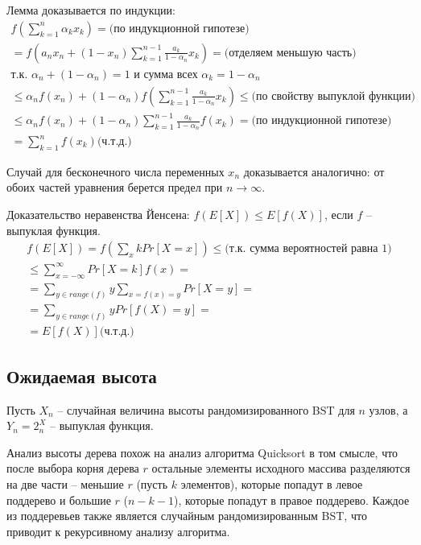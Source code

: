 \documentclass[11pt]{article}
\begin{document}
Лемма доказывается по индукции:
\begin{align*}
  f(\sum_{k=1}^{n} \alpha_k x_k) = \text{(по индукционной гипотезе)} \\ 
  = f(a_n x_n + (1-x_n) \sum_{k=1}^{n-1} \frac{a_k}{1-\alpha_n} x_k) = \text{(отделяем меньшую часть)} \\
  \text{т.к. } \alpha_n + (1-\alpha_n) = 1 \text{ и сумма всех } \alpha_k = 1 - \alpha_n \\
  \leqslant \alpha_n f(x_n) + (1-\alpha_n)f(\sum_{k=1}^{n-1} \frac{a_k}{1-\alpha_n} x_k) \leqslant \text{(по свойству выпуклой функции)} \\
  \leqslant \alpha_n f(x_n) + (1-\alpha_n)\sum_{k=1}^{n-1} \frac{a_k}{1-\alpha_n} f(x_k) = \text{(по индукционной гипотезе)} \\
  = \sum_{k=1}^{n} f(x_k) \text{(ч.т.д.)}
\end{align*}

Случай для бесконечного числа переменных $x_n$ доказывается аналогично: от обоих частей уравнения берется предел при $n \to \infty$.

Доказательство неравенства Йенсена: $f(E[X]) \leqslant E[f(X)]$, если $f$ -- выпуклая функция.
\begin{align*}
  f(E[X]) = f(\sum_{x} k Pr[X = x]) \leqslant \text{(т.к. сумма вероятностей равна 1)} \\
  \leqslant \sum_{x= - \infty}^{\infty} Pr[X = k] f(x) = \\ 
  = \sum_{y \in range(f)} y \sum_{x = f(x) = y} Pr[X = y] = \\
  = \sum_{y \in range(f)} y Pr[f(X) = y] = \\
  = E[f(X)] \text{(ч.т.д.)}
\end{align*}

\subsection{Ожидаемая высота}

Пусть $X_n$ -- случайная величина высоты рандомизированного BST для $n$ узлов, а $Y_n = 2^X_n$ -- выпуклая функция.

Анализ высоты дерева похож на анализ алгоритма Quicksort в том смысле, что после выбора корня дерева $r$ остальные элементы исходного массива разделяются на две части -- меньшие $r$ (пусть $k$ элементов), которые попадут в левое поддерево и большие $r$ ($n - k - 1$), которые попадут в правое поддерево. Каждое из поддеревьев также является случайным рандомизированным BST, что приводит к рекурсивному анализу алгоритма.
\end{document}
